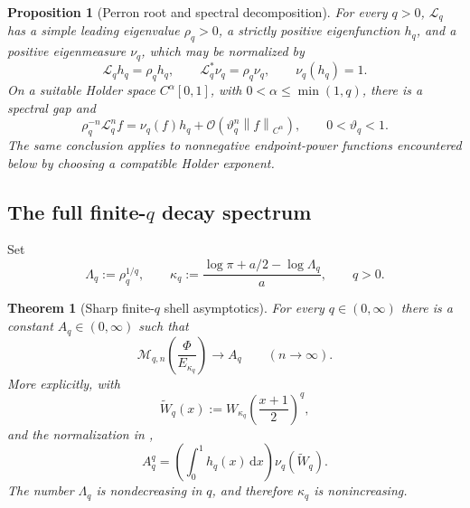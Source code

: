 \documentclass[11pt,oneside]{article}
\newtheorem{theorem}{Theorem}[section]
\newtheorem{proposition}[proposition]{Proposition}
\theoremstyle{definition}
\theoremstyle{remark}
\newcommand{\dd}{\,\mathrm d}
\newcommand{\Phiup}{\Phi}
\newcommand{\bigO}{\mathcal O}
\newcommand{\norm}[1]{\left\lVert#1\right\rVert}
\begin{document}
\begin{proposition}[Perron root and spectral decomposition]
\label{prop:RPF}
For every $q>0$, $\mathcal L_q$ has a simple leading eigenvalue
$\rho_q>0$, a strictly positive eigenfunction $h_q$, and a positive eigenmeasure $\nu_q$,
which may be normalized by
\[
 \mathcal L_qh_q=\rho_qh_q,
 \qquad
 \mathcal L_q^*\nu_q=\rho_q\nu_q,
 \qquad
 \nu_q(h_q)=1.
\]
On a suitable Holder space $C^\alpha[0,1]$, with
$0<\alpha\le\min(1,q)$, there is a spectral gap and
\begin{equation}
 \rho_q^{-n}\mathcal L_q^nf
 =\nu_q(f)h_q+\bigO(\vartheta_q^n\norm f_{C^\alpha}),
 \qquad 0<\vartheta_q<1.
 \label{eq:RPF-convergence}
\end{equation}
The same conclusion applies to nonnegative endpoint-power functions encountered below by
choosing a compatible Holder exponent.
\end{proposition}

\subsection{The full finite-\texorpdfstring{$q$}{q} decay spectrum}

Set
\begin{equation}
 \Lambda_q:=\rho_q^{1/q},
 \qquad
 \kappa_q:=\frac{\log\pi+a/2-\log\Lambda_q}{a},
 \qquad q>0.
 \label{eq:kappa-q}
\end{equation}

\begin{theorem}[Sharp finite-$q$ shell asymptotics]
\label{thm:Lq-spectrum}
For every $q\in(0,\infty)$ there is a constant $A_q\in(0,\infty)$ such that
\begin{equation}
 \mathcal M_{q,n}\!\left(\frac{\Phiup}{E_{\kappa_q}}\right)
 \longrightarrow A_q
 \qquad(n\to\infty).
 \label{eq:Lq-limit}
\end{equation}
More explicitly, with
\[
 \widetilde W_{q}(x)
 :=W_{\kappa_q}\!\left(\frac{x+1}{2}\right)^q,
\]
and the normalization in ,
\begin{equation}
 A_q^q=\left(\int_0^1h_q(x)\dd x\right)\nu_q(\widetilde W_q).
 \label{eq:Aq}
\end{equation}
The number $\Lambda_q$ is nondecreasing in $q$, and therefore $\kappa_q$ is nonincreasing.
\end{theorem}
\end{document}
